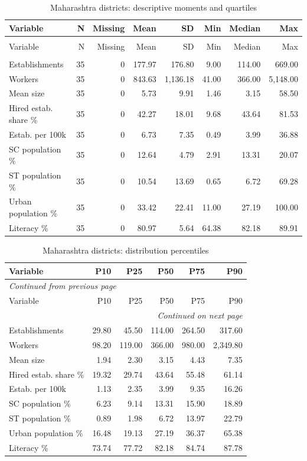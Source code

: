 \documentclass[11pt,a4paper]{report}
\begin{document}
\begin{longtable}{>{\raggedright\arraybackslash}p{3.5cm}rrrrrrr}
\caption{Maharashtra districts: descriptive moments and quartiles}\\\toprule
Variable & N & Missing & Mean & SD & Min & Median & Max \\\midrule\endfirsthead
\multicolumn{8}{l}{\textit{Continued from previous page}}\\\toprule
Variable & N & Missing & Mean & SD & Min & Median & Max \\\midrule\endhead
\midrule\multicolumn{8}{r}{\textit{Continued on next page}}\\\endfoot\bottomrule\endlastfoot
Establishments & 35 & 0 & 177.97 & 176.80 & 9.00 & 114.00 & 669.00 \\
Workers & 35 & 0 & 843.63 & 1,136.18 & 41.00 & 366.00 & 5,148.00 \\
Mean size & 35 & 0 & 5.73 & 9.91 & 1.46 & 3.15 & 58.50 \\
Hired estab. share \% & 35 & 0 & 42.27 & 18.01 & 9.68 & 43.64 & 81.53 \\
Estab. per 100k & 35 & 0 & 6.73 & 7.35 & 0.49 & 3.99 & 36.88 \\
SC population \% & 35 & 0 & 12.64 & 4.79 & 2.91 & 13.31 & 20.07 \\
ST population \% & 35 & 0 & 10.54 & 13.69 & 0.65 & 6.72 & 69.28 \\
Urban population \% & 35 & 0 & 33.42 & 22.41 & 11.00 & 27.19 & 100.00 \\
Literacy \% & 35 & 0 & 80.97 & 5.64 & 64.38 & 82.18 & 89.91 \\
\end{longtable}\endgroup
\begingroup\footnotesize\setlength{\tabcolsep}{4pt}
\begin{longtable}{lrrrrr}
\caption{Maharashtra districts: distribution percentiles}\\\toprule
Variable & P10 & P25 & P50 & P75 & P90 \\\midrule\endfirsthead
\multicolumn{6}{l}{\textit{Continued from previous page}}\\\toprule
Variable & P10 & P25 & P50 & P75 & P90 \\\midrule\endhead
\midrule\multicolumn{6}{r}{\textit{Continued on next page}}\\\endfoot\bottomrule\endlastfoot
Establishments & 29.80 & 45.50 & 114.00 & 264.50 & 317.60 \\
Workers & 98.20 & 119.00 & 366.00 & 980.00 & 2,349.80 \\
Mean size & 1.94 & 2.30 & 3.15 & 4.43 & 7.35 \\
Hired estab. share \% & 19.32 & 29.74 & 43.64 & 55.48 & 61.14 \\
Estab. per 100k & 1.13 & 2.35 & 3.99 & 9.35 & 16.26 \\
SC population \% & 6.23 & 9.14 & 13.31 & 15.90 & 18.89 \\
ST population \% & 0.89 & 1.98 & 6.72 & 13.97 & 22.79 \\
Urban population \% & 16.48 & 19.13 & 27.19 & 36.37 & 65.38 \\
Literacy \% & 73.74 & 77.72 & 82.18 & 84.74 & 87.78 \\
\end{longtable}\endgroup
\end{document}
